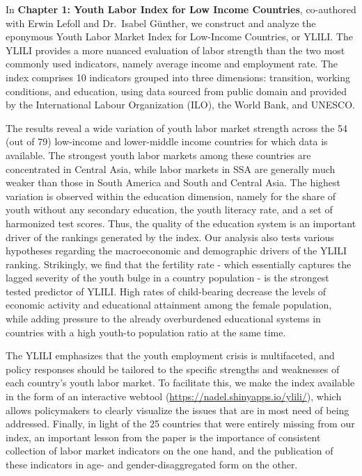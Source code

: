 \documentclass[
  a4paper, twoside, 12pt]{book}
\begin{document}
\noindent In \textbf{Chapter 1: Youth Labor Index for Low Income Countries}, co-authored with Erwin Lefoll and Dr.~Isabel Günther, we construct and analyze the eponymous Youth Labor Market Index for Low-Income Countries, or YLILI. The YLILI provides a more nuanced evaluation of labor strength than the two most commonly used indicators, namely average income and employment rate. The index comprises 10 indicators grouped into three dimensions: transition, working conditions, and education, using data sourced from public domain and provided by the International Labour Organization (ILO), the World Bank, and UNESCO.

The results reveal a wide variation of youth labor market strength across the 54 (out of 79) low-income and lower-middle income countries for which data is available. The strongest youth labor markets among these countries are concentrated in Central Asia, while labor markets in SSA are generally much weaker than those in South America and South and Central Asia. The highest variation is observed within the education dimension, namely for the share of youth without any secondary education, the youth literacy rate, and a set of harmonized test scores. Thus, the quality of the education system is an important driver of the rankings generated by the index. Our analysis also tests various hypotheses regarding the macroeconomic and demographic drivers of the YLILI ranking. Strikingly, we find that the fertility rate - which essentially captures the lagged severity of the youth bulge in a country population - is the strongest tested predictor of YLILI. High rates of child-bearing decrease the levels of economic activity and educational attainment among the female population, while adding pressure to the already overburdened educational systems in countries with a high youth-to population ratio at the same time.

The YLILI emphasizes that the youth employment crisis is multifaceted, and policy responses should be tailored to the specific strengths and weaknesses of each country's youth labor market. To facilitate this, we make the index available in the form of an interactive webtool (\href{https://nadel.shinyapps.io/ylili}{https://nadel.shinyapps.io/ylili/}), which allows policymakers to clearly visualize the issues that are in most need of being addressed. Finally, in light of the 25 countries that were entirely missing from our index, an important lesson from the paper is the importance of consistent collection of labor market indicators on the one hand, and the publication of these indicators in age- and gender-disaggregated form on the other.
\end{document}
